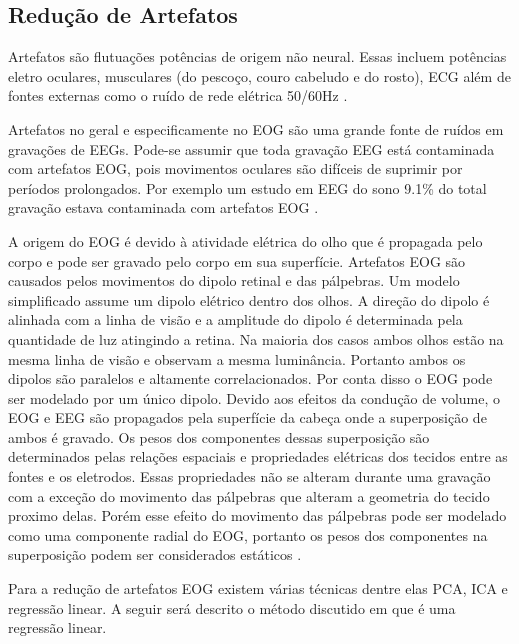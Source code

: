 \subsection{Redu\c{c}\~ao de Artefatos}
\par
Artefatos s\~ao flutua\c{c}\~oes pot\^encias de origem n\~ao neural. Essas incluem pot\^encias eletro oculares, musculares (do pesco\c{c}o, couro cabeludo e do rosto), \ac{ECG} al\'em de fontes externas como o ru\'ido de rede el\'etrica 50/60Hz  \cite{Vidal77} \cite{RAO}.
\par
Artefatos no geral e especificamente no \ac{EOG} s\~ao uma grande fonte de ru\'idos em grava\c{c}\~oes de \ac{EEGs}.
Pode-se assumir que toda grava\c{c}\~ao \ac{EEG} est\'a contaminada com artefatos \ac{EOG}, pois movimentos oculares s\~ao dif\'iceis de suprimir por per\'iodos prolongados.
Por exemplo um estudo em \ac{EEG} do sono 9.1\% do total grava\c{c}\~ao estava contaminada com artefatos \ac{EOG} \cite{EOG2006}.
\par
A origem do \ac{EOG} \'e devido \`a atividade el\'etrica do olho que \'e propagada pelo corpo e pode ser gravado pelo corpo em sua superf\'icie.
Artefatos \ac{EOG} s\~ao causados pelos movimentos do dipolo retinal e das p\'alpebras.
Um modelo simplificado assume um dipolo el\'etrico dentro dos olhos.
A dire\c{c}\~ao do dipolo \'e alinhada com a linha de vis\~ao e a amplitude do dipolo \'e determinada pela quantidade de luz atingindo a retina.
Na maioria dos casos ambos olhos est\~ao na mesma linha de vis\~ao e observam a mesma lumin\^ancia. Portanto ambos os dipolos s\~ao paralelos e altamente correlacionados.
Por conta disso o \ac{EOG} pode ser modelado por um \'unico dipolo. 
Devido aos efeitos da condu\c{c}\~ao de volume, o \ac{EOG} e \ac{EEG} s\~ao propagados pela superf\'icie da cabe\c{c}a onde a superposi\c{c}\~ao de ambos \'e gravado.
Os pesos dos componentes dessas superposi\c{c}\~ao s\~ao determinados pelas rela\c{c}\~oes espaciais e propriedades el\'etricas dos tecidos entre as fontes e os eletrodos.
Essas propriedades n\~ao se alteram durante uma grava\c{c}\~ao com a exce\c{c}\~ao do movimento das p\'alpebras que alteram a geometria do tecido proximo delas.
Por\'em esse efeito do movimento das p\'alpebras pode ser modelado como uma componente radial do \ac{EOG}, portanto os pesos dos componentes na superposi\c{c}\~ao podem ser considerados est\'aticos \cite{EOG2006}.
\par
Para a redu\c{c}\~ao de artefatos \ac{EOG} existem v\'arias t\'ecnicas dentre elas \ac{PCA}, \ac{ICA} e regress\~ao linear.
A seguir ser\'a descrito o m\'etodo discutido em \cite{EOG2006} que \'e uma regress\~ao linear.
